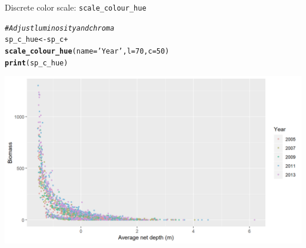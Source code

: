 \documentclass{beamer}\usepackage[]{graphicx}\usepackage[]{color}
\makeatletter
\newcommand{\hlnum}[1]{\textcolor[rgb]{0.686,0.059,0.569}{#1}}%
\newcommand{\hlstr}[1]{\textcolor[rgb]{0.192,0.494,0.8}{#1}}%
\newcommand{\hlcom}[1]{\textcolor[rgb]{0.678,0.584,0.686}{\textit{#1}}}%
\newcommand{\hlopt}[1]{\textcolor[rgb]{0,0,0}{#1}}%
\newcommand{\hlstd}[1]{\textcolor[rgb]{0.345,0.345,0.345}{#1}}%
\newcommand{\hlkwb}[1]{\textcolor[rgb]{0.69,0.353,0.396}{#1}}%
\newcommand{\hlkwc}[1]{\textcolor[rgb]{0.333,0.667,0.333}{#1}}%
\newcommand{\hlkwd}[1]{\textcolor[rgb]{0.737,0.353,0.396}{\textbf{#1}}}%
\newenvironment{kframe}{%
 \def\at@end@of@kframe{}%
 \ifinner\ifhmode%
  \def\at@end@of@kframe{\end{minipage}}%
  \begin{minipage}{\columnwidth}%
 \fi\fi%
 \def\FrameCommand##1{\hskip\@totalleftmargin \hskip-\fboxsep
 \colorbox{shadecolor}{##1}\hskip-\fboxsep
     \hskip-\linewidth \hskip-\@totalleftmargin \hskip\columnwidth}%
 \MakeFramed {\advance\hsize-\width
   \@totalleftmargin\z@ \linewidth\hsize
   \@setminipage}}%
 {\par\unskip\endMakeFramed%
 \at@end@of@kframe}
\newenvironment{knitrout}{}{} %
\makeatother
\begin{document}
\begin{frame}[fragile]{Discrete color scale: \lstinline{scale_colour_hue}}
\begin{knitrout}\footnotesize
{}\color{fgcolor}\begin{kframe}
\begin{alltt}
\hlcom{# Adjust luminosity and chroma}
\hlstd{sp_c_hue} \hlkwb{<-} \hlstd{sp_c} \hlopt{+}
  \hlkwd{scale_colour_hue}\hlstd{(}\hlkwc{name}\hlstd{=}\hlstr{'Year'}\hlstd{,} \hlkwc{l}\hlstd{=}\hlnum{70}\hlstd{,} \hlkwc{c}\hlstd{=}\hlnum{50}\hlstd{)}
\hlkwd{print}\hlstd{(sp_c_hue)}
\end{alltt}
\end{kframe}

{\centering \includegraphics[width=.9\linewidth]{figure/sp_discrete_color_hue2b-1} 

}



\end{knitrout}
\end{frame}
\end{document}

